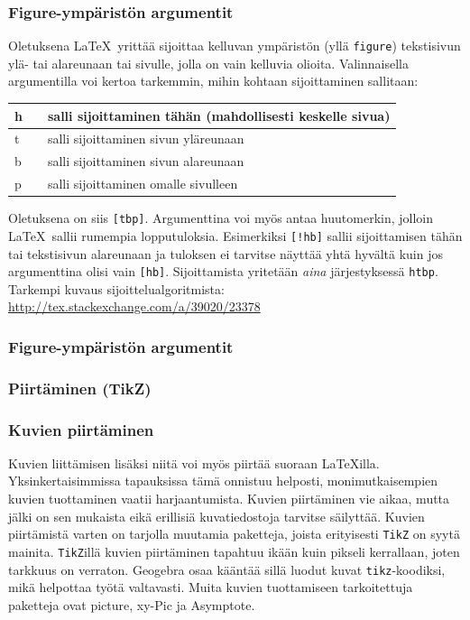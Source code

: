\begin{frame}[fragile]
    \frametitle{Figure-ympäristön argumentit}
    Oletuksena \LaTeX\ yrittää sijoittaa kelluvan ympäristön (yllä \verb-figure-) tekstisivun ylä- tai alareunaan tai sivulle, jolla on vain kelluvia olioita. Valinnaisella argumentilla voi kertoa tarkemmin, mihin kohtaan sijoittaminen sallitaan:
    \begin{table}
        \begin{tabular}{lcl}

            h && salli sijoittaminen tähän (mahdollisesti keskelle sivua)\\
            \hline
            t && salli sijoittaminen sivun yläreunaan\\
            \hline
            b && salli sijoittaminen sivun alareunaan\\
            \hline
            p && salli sijoittaminen omalle sivulleen

        \end{tabular}
    \end{table}
    Oletuksena on siis \verb-[tbp]-. Argumenttina voi myös antaa huutomerkin, jolloin \LaTeX\ sallii rumempia lopputuloksia. Esimerkiksi \verb-[!hb]- sallii sijoittamisen tähän tai tekstisivun alareunaan ja tuloksen ei tarvitse näyttää yhtä hyvältä kuin jos argumenttina olisi vain \verb-[hb]-. Sijoittamista yritetään \emph{aina} järjestyksessä \verb-htbp-. Tarkempi kuvaus sijoittelualgoritmista: \url{http://tex.stackexchange.com/a/39020/23378}

\end{frame}
\begin{frame}[fragile]
    \frametitle{Figure-ympäristön argumentit}
    
\end{frame}
\subsubsection{Piirtäminen (TikZ)}
\begin{frame}[fragile]
    \frametitle{Kuvien piirtäminen}
    Kuvien liittämisen lisäksi niitä voi myös piirtää suoraan \LaTeX illa. Yksinkertaisimmissa tapauksissa tämä onnistuu helposti, monimutkaisempien kuvien tuottaminen vaatii harjaantumista.
    \vaihto
    Kuvien piirtäminen vie aikaa, mutta jälki on sen mukaista eikä erillisiä kuvatiedostoja tarvitse säilyttää.
    \vaihto Kuvien piirtämistä varten on tarjolla muutamia paketteja, joista erityisesti \verb-TikZ- on syytä mainita. 
    \verb-TikZ-illä kuvien piirtäminen tapahtuu ikään kuin pikseli kerrallaan, joten tarkkuus on verraton. 
    \vaihto Geogebra osaa kääntää sillä luodut kuvat \verb-tikz--koodiksi, mikä helpottaa työtä valtavasti.
    \vaihto Muita kuvien tuottamiseen tarkoitettuja paketteja ovat picture, xy-Pic ja Asymptote.
\end{frame}
\begin{frame}[fragile]
    
    

\end{frame}
